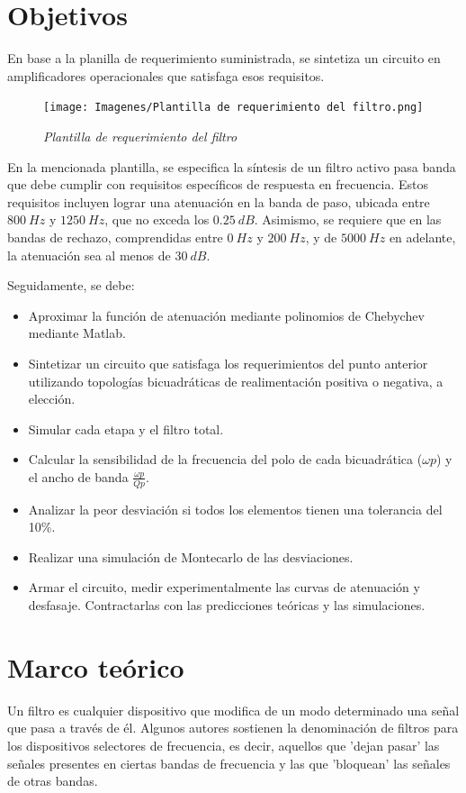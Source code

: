 \documentclass[12pt,A4paper,titlepage]{article}
\begin{document}
\newpage
\section{Objetivos}
\hspace{1mm} En base a la planilla de requerimiento suministrada, se sintetiza un circuito en amplificadores operacionales que satisfaga esos requisitos.

\begin{figure}[!h] 
  \centering
  \texttt{[image: Imagenes/Plantilla de requerimiento del filtro.png]}
  \caption{\textit{Plantilla de requerimiento del filtro}}
\end{figure}


\hspace{1mm} En la mencionada plantilla, se especifica la síntesis de un filtro activo pasa banda que debe cumplir con requisitos específicos de respuesta en frecuencia. Estos requisitos incluyen lograr una atenuación en la banda de paso, ubicada entre \(800~Hz\) y \(1250~Hz\), que no exceda los \(0.25~dB\). Asimismo, se requiere que en las bandas de rechazo, comprendidas entre \(0~Hz\) y \(200~Hz\), y de \(5000~Hz\) en adelante, la atenuación sea al menos de \(30~dB\).

\bigskip
\hspace{1mm} Seguidamente, se debe:
\begin{itemize}[itemsep=1pt]
    \item Aproximar la función de atenuación mediante polinomios de Chebychev mediante Matlab.
    \item Sintetizar un circuito que satisfaga los requerimientos del punto anterior utilizando topologías bicuadráticas de realimentación positiva o negativa, a elección.
    \item Simular cada etapa y el filtro total.
    \item Calcular la sensibilidad de la frecuencia del polo de cada bicuadrática (\(\omega p\)) y el ancho de banda \(\frac{\omega p}{Qp}\).
    \item Analizar la peor desviación si todos los elementos tienen una tolerancia del 10\%.
    \item Realizar una simulación de Montecarlo de las desviaciones.
    \item Armar el circuito, medir experimentalmente las curvas de atenuación y desfasaje. Contractarlas con las predicciones teóricas y las simulaciones.
\end{itemize}

\newpage
\section{Marco teórico}
\hspace{1mm} Un filtro es cualquier dispositivo que modifica de un modo determinado una señal que pasa a través de él. Algunos autores sostienen la denominación de filtros para los dispositivos selectores de frecuencia, es decir, aquellos que 'dejan pasar' las señales presentes en ciertas bandas de frecuencia y las que 'bloquean' las señales de otras bandas.
\end{document}
